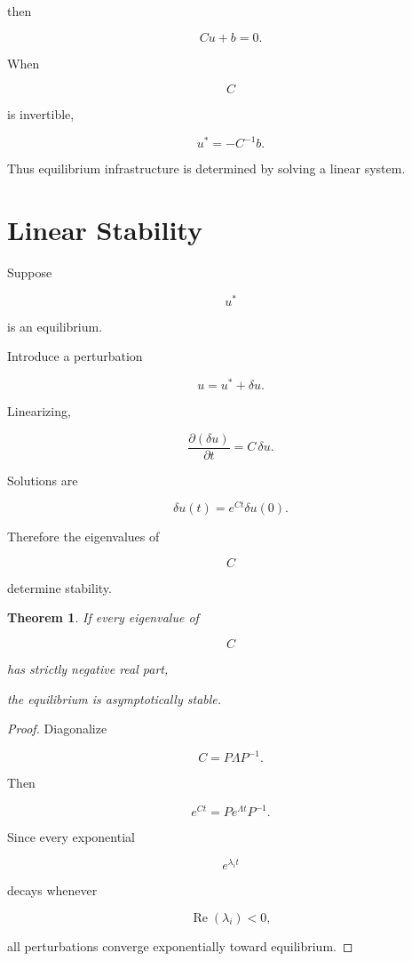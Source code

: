\documentclass[11pt,fleqn]{book}
\numberwithin{equation}{chapter}
\theoremstyle{plain}
\newtheorem{theorem}{Theorem}[chapter]
\theoremstyle{definition}
\theoremstyle{remark}
\begin{document}
then

\[
Cu+b=0.
\]

When

\[
C
\]

is invertible,

\[
\boxed{
u^*
=
-C^{-1}b.
}
\]

Thus equilibrium infrastructure is determined by solving a linear system.


\section{Linear Stability}

Suppose

\[
u^*
\]

is an equilibrium.

Introduce a perturbation

\[
u=u^*+\delta u.
\]

Linearizing,

\[
\frac{\partial(\delta u)}{\partial t}
=
C\,\delta u.
\]

Solutions are

\[
\delta u(t)
=
e^{Ct}\delta u(0).
\]

Therefore the eigenvalues of

\[
C
\]

determine stability.


\begin{theorem}

If every eigenvalue of

\[
C
\]

has strictly negative real part,

the equilibrium is asymptotically stable.

\end{theorem}

\begin{proof}

Diagonalize

\[
C=P\Lambda P^{-1}.
\]

Then

\[
e^{Ct}
=
Pe^{\Lambda t}P^{-1}.
\]

Since every exponential

\[
e^{\lambda_i t}
\]

decays whenever

\[
\operatorname{Re}(\lambda_i)<0,
\]

all perturbations converge exponentially toward equilibrium.

\end{proof}
\end{document}
